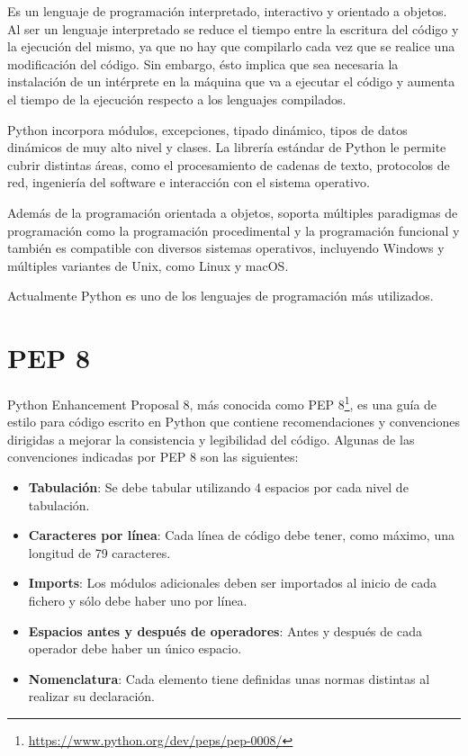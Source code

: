 \documentclass[a4paper, 12pt]{book}
\begin{document}
Es un lenguaje de programación interpretado, interactivo y orientado a objetos. Al ser un lenguaje interpretado se reduce el tiempo entre la escritura del código y la ejecución del mismo, ya que no hay que compilarlo cada vez que se realice una modificación del código. Sin embargo, ésto implica que sea necesaria la instalación de un intérprete en la máquina que va a ejecutar el código y aumenta el tiempo de la ejecución respecto a los lenguajes compilados.

Python incorpora módulos, excepciones, tipado dinámico, tipos de datos dinámicos de muy alto nivel y clases. La librería estándar de Python le permite cubrir distintas áreas, como el procesamiento de cadenas de texto, protocolos de red, ingeniería del software e interacción con el sistema operativo.

Además de la programación orientada a objetos, soporta múltiples paradigmas de programación como la programación procedimental y la programación funcional y también es compatible con diversos sistemas operativos, incluyendo Windows y múltiples variantes de Unix, como Linux y macOS.

Actualmente Python es uno de los lenguajes de programación más utilizados.\cite{stackoverflowsurvey}

\section{PEP 8} 
\label{sec:pep8}
Python Enhancement Proposal 8, más conocida como PEP 8\footnote{\url{https://www.python.org/dev/peps/pep-0008/}}, es una guía de estilo para código escrito en Python que contiene recomendaciones y convenciones dirigidas a mejorar la consistencia y legibilidad del código.
Algunas de las convenciones indicadas por PEP 8 son las siguientes:
\begin{itemize}
	\item \textbf{Tabulación}: Se debe tabular utilizando 4 espacios por cada nivel de tabulación.
	\item \textbf{Caracteres por línea}: Cada línea de código debe tener, como máximo, una longitud de 79 caracteres.
	\item \textbf{Imports}: Los módulos adicionales deben ser importados al inicio de cada fichero y sólo debe haber uno por línea.
	\item \textbf{Espacios antes y después de operadores}: Antes y después de cada operador debe haber un único espacio.
	\item \textbf{Nomenclatura}: Cada elemento tiene definidas unas normas distintas al realizar su declaración.
\end{itemize}
\end{document}
